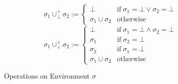 \documentclass{jsarticle}
\begin{document}
\begin{figure}[H]
  \begin{equation*}
    \sigma_1\cup^+_\bot\sigma_2 :=
    \begin{cases}
      \bot                 &\text{if}\;\sigma_1=\bot\vee\sigma_2=\bot \\
      \sigma_1\cup\sigma_2 &\text{otherwise}
    \end{cases}
  \end{equation*}
  \begin{equation*}
    \sigma_1\cup^\times_\bot\sigma_2 :=
    \begin{cases}
      \bot                 &\text{if}\;\sigma_1=\bot\wedge\sigma_2=\bot \\
      \sigma_1             &\text{if}\;\sigma_2=\bot \\
      \sigma_2             &\text{if}\;\sigma_1=\bot \\
      \sigma_1\cup\sigma_2 &\text{otherwise}
    \end{cases}
  \end{equation*}
  \caption{Operations on Environment $\sigma$}
  \label{fig:op_env}
\end{figure}
\end{document}
